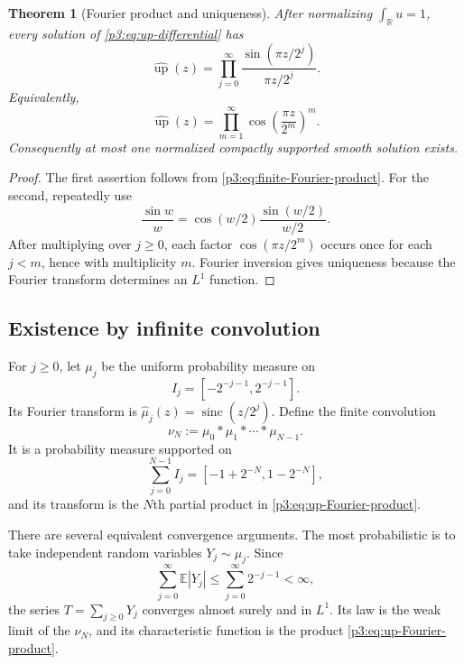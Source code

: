\documentclass[11pt]{article}
\numberwithin{equation}{section}
\newtheorem{theorem}{Theorem}[section]
\theoremstyle{definition}
\theoremstyle{remark}
\newcommand{\R}{\mathbb R}
\newcommand{\upf}{\operatorname{up}}
\newcommand{\sinc}{\operatorname{sinc}}
\begin{document}
\begin{theorem}[Fourier product and uniqueness]\label{p3:thm:Fourier-product}
After normalizing $\int_\R u=1$, every solution of \eqref{p3:eq:up-differential} has
\begin{equation}\label{p3:eq:up-Fourier-product}
 \widehat{\upf}(z)=\prod_{j=0}^{\infty}\frac{\sin(\pi z/2^j)}{\pi z/2^j}.
\end{equation}
Equivalently,
\begin{equation}\label{p3:eq:cos-product}
 \widehat{\upf}(z)=\prod_{m=1}^{\infty}\cos\!\left(\frac{\pi z}{2^m}\right)^{m}.
\end{equation}
Consequently at most one normalized compactly supported smooth solution exists.
\end{theorem}

\begin{proof}
The first assertion follows from \eqref{p3:eq:finite-Fourier-product}.  For the second, repeatedly use
\[
 \frac{\sin w}{w}=\cos(w/2)\frac{\sin(w/2)}{w/2}.
\]
After multiplying over $j\ge0$, each factor $\cos(\pi z/2^m)$ occurs once for each $j<m$, hence with multiplicity $m$.  Fourier inversion gives uniqueness because the Fourier transform determines an $L^1$ function.
\end{proof}

\subsection{Existence by infinite convolution}

For $j\ge0$, let $\mu_j$ be the uniform probability measure on
\[
 I_j=[-2^{-j-1},2^{-j-1}].
\]
Its Fourier transform is $\widehat\mu_j(z)=\sinc(z/2^j)$.  Define the finite convolution
\begin{equation}\label{p3:eq:finite-convolution}
 \nu_N:=\mu_0*\mu_1*\cdots*\mu_{N-1}.
\end{equation}
It is a probability measure supported on
\[
 \sum_{j=0}^{N-1}I_j=[-1+2^{-N},1-2^{-N}],
\]
and its transform is the $N$th partial product in \eqref{p3:eq:up-Fourier-product}.

There are several equivalent convergence arguments.  The most probabilistic is to take independent random variables $Y_j\sim\mu_j$.  Since
\[
 \sum_{j=0}^{\infty}\mathbb E|Y_j|\le\sum_{j=0}^{\infty}2^{-j-1}<\infty,
\]
the series $T=\sum_{j\ge0}Y_j$ converges almost surely and in $L^1$.  Its law is the weak limit of the $\nu_N$, and its characteristic function is the product \eqref{p3:eq:up-Fourier-product}.
\end{document}
